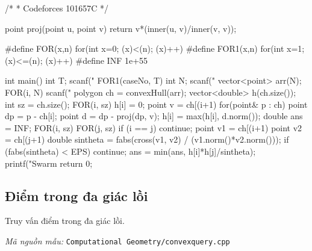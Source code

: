 \documentclass[11pt]{article}
\newcommand{\codepath}[1]{\par\noindent\textit{Mã nguồn mẫu:} \texttt{#1}\par}
\begin{document}
\begin{vncode}
/*
 * Codeforces 101657C
 */

point proj(point u, point v) {
	return v*(inner(u, v)/inner(v, v));
}

#define FOR(x,n) for(int x=0; (x)<(n); (x)++)
#define FOR1(x,n) for(int x=1; (x)<=(n); (x)++)
#define INF 1e+55

int main() {
	int T;
	scanf("%
	FOR1(caseNo, T) {
		int N;
		scanf("%
		vector<point> arr(N);
		FOR(i, N) {
			scanf("%
		}
		polygon ch = convexHull(arr);
		vector<double> h(ch.size());
		int sz = ch.size();
		FOR(i, sz) {
			h[i] = 0;
			point v = ch[(i+1)%
			for(point& p : ch) {
				point dp = p - ch[i];
				point d = dp - proj(dp, v);
				h[i] = max(h[i], d.norm());
			}
		}
		double ans = INF;
		FOR(i, sz) {
			FOR(j, sz) {
				if (i == j) continue;
				point v1 = ch[(i+1)%
				point v2 = ch[(j+1)%
				double sintheta = fabs(cross(v1, v2) / (v1.norm()*v2.norm()));
				if (fabs(sintheta) < EPS) continue;
				ans = min(ans, h[i]*h[j]/sintheta);
			}
		}
		printf("Swarm %
	}
	return 0;
}
\end{vncode}
\endgroup


\subsection{Điểm trong đa giác lồi}

Truy vấn điểm trong đa giác lồi.

\codepath{Computational Geometry/convexquery.cpp}
\end{document}
